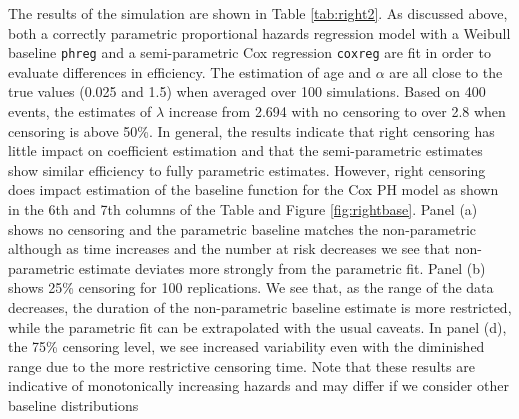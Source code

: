 \documentclass[12pt,letterpaper]{article}
\begin{document}
The results of the simulation are shown in Table \ref{tab:right2}. As discussed above, both a correctly parametric proportional hazards regression model with a Weibull baseline {\tt phreg} and a semi-parametric Cox regression {\tt coxreg} are fit in order to evaluate differences in efficiency. The estimation of age and $\alpha$ are all close to the true values (0.025 and 1.5) when averaged over 100 simulations.  Based on 400 events, the estimates of $\lambda$ increase from 2.694 with no censoring to over 2.8 when censoring is above 50\%.  In general, the results indicate that right censoring has little impact on coefficient estimation and that the semi-parametric estimates show similar efficiency to fully parametric estimates. However, right censoring does impact estimation of the  baseline function for the Cox PH model as shown in the 6th and 7th columns of the Table and Figure \ref{fig:rightbase}.  Panel (a) shows no censoring and the parametric baseline matches the non-parametric although as time increases and the number at risk decreases we see that non-parametric estimate deviates more strongly from the parametric fit.  Panel (b) shows 25\% censoring for 100 replications.  We see that, as the range of the data decreases, the duration of the non-parametric baseline estimate is more restricted, while the parametric fit can be extrapolated with the usual caveats.  In panel (d), the 75\% censoring level, we see increased variability even with the diminished range due to the more restrictive censoring time.  Note that these results are indicative of monotonically increasing hazards and may differ if we consider other baseline distributions
\end{document}
